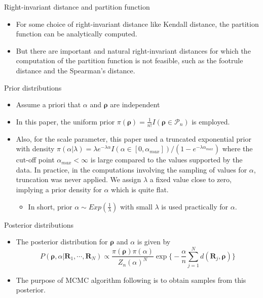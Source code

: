 \documentclass[11pt]{beamer}
\begin{document}
\begin{frame}{Right-invariant distance and partition function}
\begin{itemize}
    \item For some choice of right-invariant distance like Kendall distance, the partition function can be analytically computed. 
    \item But there are important and natural right-invariant distances for which the computation of the partition function is not feasible, such as the footrule distance and the Spearman's distance.
\end{itemize}
\end{frame}

\begin{frame}{Prior distributions}
    \begin{itemize}
        \item Assume a priori that $\alpha$ and $\boldsymbol{\rho}$ are independent
        \item In this paper, the uniform prior $\pi(\boldsymbol{\rho})=\frac{1}{n!}I(\boldsymbol{\rho}\in \mathcal{P}_n)$ is employed.
        \item Also, for the scale parameter, this paper used a truncated exponential prior with density $\pi(\alpha | \lambda)=\lambda e^{-\lambda \alpha}I(\alpha\in [0, \alpha_{max}])/(1-e^{-\lambda \alpha_{max}})$ where the cut-off point $\alpha_{max}<\infty$ is large compared to the values supported by the data. In practice, in the computations involving the sampling of values for $\alpha$, truncation was never applied. We assign $\lambda$ a fixed value close to zero, implying a prior density for $\alpha$ which is quite flat.
        \begin{itemize}
            \item In short, prior $\alpha \sim Exp(\frac{1}{\lambda})$ with small $\lambda$ is used practically for $\alpha$. 
        \end{itemize}
    \end{itemize}
\end{frame}

\begin{frame}{Posterior distributions}
\begin{itemize}
    \item The posterior distribution for $\boldsymbol{\rho}$ and $\alpha$ is given by
    \begin{equation}
        P(\boldsymbol{\rho}, \alpha| \mathbf{R}_1, \cdots, \mathbf{R}_N)\propto \frac{\pi(\boldsymbol{\rho})\pi(\alpha)}{Z_n(\alpha)^N} \exp \big\{-\frac{\alpha}{n}\sum_{j=1}^N d(\mathbf{R}_j, \boldsymbol{\rho})\big\}
    \end{equation}
    \item The purpose of MCMC algorithm following is to obtain samples from this posterior.
\end{itemize}
\end{frame}
\end{document}
